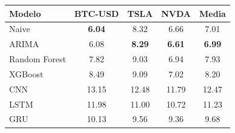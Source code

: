 \begin{tabular}{l|ccc|c}
\hline
\textbf{Modelo} & \textbf{BTC-USD} & \textbf{TSLA} & \textbf{NVDA} & \textbf{Media} \\
\hline
Naive & \textbf{6.04} & 8.32 & 6.66 & 7.01 \\
ARIMA & 6.08 & \textbf{8.29} & \textbf{6.61} & \textbf{6.99} \\
Random Forest & 7.82 & 9.03 & 6.94 & 7.93 \\
XGBoost & 8.49 & 9.09 & 7.02 & 8.20 \\
CNN & 13.15 & 12.48 & 11.79 & 12.47 \\
LSTM & 11.98 & 11.00 & 10.72 & 11.23 \\
GRU & 10.13 & 9.56 & 9.36 & 9.68 \\
\hline
\end{tabular}